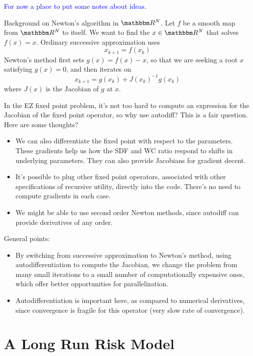 \documentclass[12pt, reqno]{amsart}
\newcommand{\1}{\mathbbm 1}
\newcommand{\RR}{\mathbbm R}
\theoremstyle{plain}
\theoremstyle{definition}
\begin{document}
\textcolor{blue}{For now a place to put some notes about ideas.}

Background on Newton's algorithm in $\RR^N$.  Let $f$ be a smooth map from
$\RR^N$ to itself.  We want to find the $x \in \RR^N$ that solves $f(x)=x$.
Ordinary successive approximation uses
%
\begin{equation}
    x_{k+1} = f(x_k)
\end{equation}
%
Newton's method first sets $g(x) = f(x) -x$, so that we are seeking a root $x$
satisfying $g(x)=0$, and then iterates on
%
\begin{equation}
    x_{k+1} = g(x_k) + J(x_k)^{-1} g(x_k)
\end{equation}
%
where $J(x)$ is the Jacobian of $g$ at $x$.

In the EZ fixed point problem, it's not too hard to compute an expression for
the Jacobian of the fixed point operator, so why use autodiff?  This is a fair
question.  Here are some thoughts?
%
\begin{itemize}
    \item We can also differentiate the fixed point with respect to the
        parameters. These gradients help us how the SDF and WC ratio respond
        to shifts in underlying parameters.  They can also provide Jacobians
        for gradient decent.
    \item It's possible to plug other fixed point operators, associated with
        other specifications of recursive utility, directly into the code.
        There's no need to compute gradients in each case.
    \item We might be able to use second order Newton methods, since autodiff
        can provide derivatives of any order.
\end{itemize}

General points:
%
\begin{itemize}
    \item By switching from successive approximation to Newton's method, using
        autodifferentiation to compute the Jacobian, we change the problem
        from many small iterations to a small number of computationally
        expensive ones, which offer better opportunities for parallelization. 
    \item Autodifferentiation is important here, as compared to numerical
        derivatives, since convergence is fragile for this operator (very slow
        rate of convergence).
\end{itemize}


\section{A Long Run Risk Model}
\end{document}
